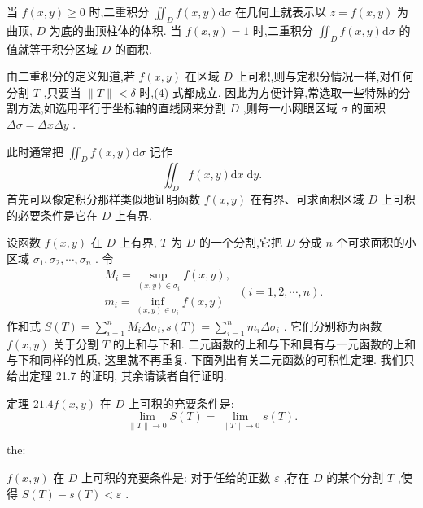当 \(f\left( {x,y}\right)  \geq  0\) 时,二重积分 \({\iint }_{D}f\left( {x,y}\right) \mathrm{d}\sigma\) 在几何上就表示以 \(z = f\left( {x,y}\right)\) 为曲顶, \(D\) 为底的曲顶柱体的体积. 当 \(f\left( {x,y}\right)  = 1\) 时,二重积分 \({\iint }_{D}f\left( {x,y}\right) \mathrm{d}\sigma\) 的值就等于积分区域 \(D\) 的面积.

由二重积分的定义知道,若 \(f\left( {x,y}\right)\) 在区域 \(D\) 上可积,则与定积分情况一样,对任何分割 \(T\) ,只要当 \(\parallel T\parallel  < \delta\) 时,(4) 式都成立. 因此为方便计算,常选取一些特殊的分割方法,如选用平行于坐标轴的直线网来分割 \(D\) ,则每一小网眼区域 \(\sigma\) 的面积 \({\Delta \sigma } = {\Delta x\Delta y}\) .

此时通常把 \({\iint }_{D}f\left( {x,y}\right) \mathrm{d}\sigma\) 记作
\[
{\iint }_{D}f\left( {x,y}\right) \mathrm{d}x\mathrm{\;d}y. \tag{6}
\]
首先可以像定积分那样类似地证明函数 \(f\left( {x,y}\right)\) 在有界、可求面积区域 \(D\) 上可积的必要条件是它在 \(D\) 上有界.

设函数 \(f\left( {x,y}\right)\) 在 \(D\) 上有界, \(T\) 为 \(D\) 的一个分割,它把 \(D\) 分成 \(n\) 个可求面积的小区域 \({\sigma }_{1},{\sigma }_{2},\cdots ,{\sigma }_{n}\) . 令
\[
\begin{array}{l} {M}_{i} = \mathop{\sup }\limits_{{\left( {x,y}\right)  \in  {\sigma }_{i}}}f\left( {x,y}\right) , \\  {m}_{i} = \mathop{\inf }\limits_{{\left( {x,y}\right)  \in  {\sigma }_{i}}}f\left( {x,y}\right)  \end{array}\;\left( {i = 1,2,\cdots ,n}\right) .
\]
作和式 \(S\left( T\right)  = \mathop{\sum }\limits_{{i = 1}}^{n}{M}_{i}\Delta {\sigma }_{i},s\left( T\right)  = \mathop{\sum }\limits_{{i = 1}}^{n}{m}_{i}\Delta {\sigma }_{i}\) . 它们分别称为函数 \(f\left( {x,y}\right)\) 关于分割 \(T\) 的上和与下和. 二元函数的上和与下和具有与一元函数的上和与下和同样的性质, 这里就不再重复. 下面列出有关二元函数的可积性定理. 我们只给出定理 21.7 的证明, 其余请读者自行证明.

定理 \({21.4f}\left( {x,y}\right)\) 在 \(D\) 上可积的充要条件是:
\[
\mathop{\lim }\limits_{{\parallel T\parallel  \rightarrow  0}}S\left( T\right)  = \mathop{\lim }\limits_{{\parallel T\parallel  \rightarrow  0}}s\left( T\right) .
\]
\begin{theorem}{}{the:}

\end{theorem}
 \(f\left( {x,y}\right)\) 在 \(D\) 上可积的充要条件是: 对于任给的正数 \(\varepsilon\) ,存在 \(D\) 的某个分割 \(T\) ,使得 \(S\left( T\right)  - s\left( T\right)  < \varepsilon\) .

